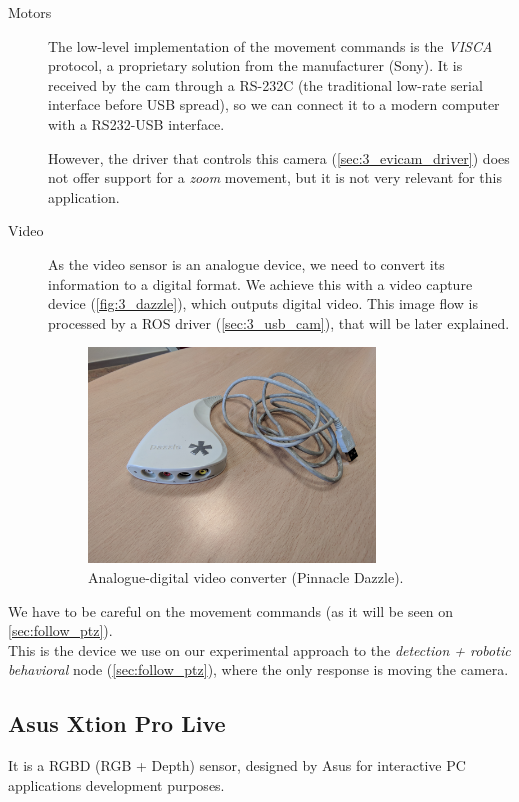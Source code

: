 		\begin{description}
			\item[Motors] 
			The low-level implementation of the movement commands is the \emph{VISCA} protocol, a proprietary solution from the manufacturer (Sony). It is received by the cam through a RS-232C (the traditional low-rate serial interface before USB spread), so we can connect it to a modern computer with a RS232-USB interface.
			
			However, the driver that controls this camera (\autoref{sec:3_evicam_driver}) does not offer support for a \emph{zoom} movement, but it is not very relevant for this application.\\
			
			\item[Video] 		As the video sensor is an analogue device, we need to convert its information to a digital format. We achieve this with a video capture device (\autoref{fig:3_dazzle}), which outputs digital video. This image flow is processed by a ROS driver (\autoref{sec:3_usb_cam}), that will be later explained.
			
			\begin{figure}[h]
				\centering
				\includegraphics[width=3in]{images/pinnacle_dazzle}
				\caption{Analogue-digital video converter (Pinnacle Dazzle).}
				\label{fig:3_dazzle}
			\end{figure}
			
			
		\end{description}

	
		We have to be careful on the movement commands (as it will be seen on \autoref{sec:follow_ptz}).\\

		This is the device we use on our experimental approach to the \emph{detection + robotic behavioral} node (\autoref{sec:follow_ptz}), where the only response is moving the camera.\\

	\subsection{Asus Xtion Pro Live}
		\label{sec:3_xtion}
		It is a RGBD (RGB + Depth) sensor, designed by Asus for interactive PC applications development purposes.

